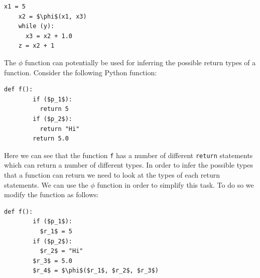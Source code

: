 \documentclass[12pt, titlepage]{article}
\begin{document}
\begin{lstlisting}[mathescape]
    x1 = 5
    x2 = $\phi$(x1, x3)
    while (y):
      x3 = x2 + 1.0
    z = x2 + 1
\end{lstlisting}
The $\phi$ function can potentially be used for inferring the possible return types of a function. Consider the following Python function:
\begin{lstlisting}[mathescape]
    def f():
        if ($p_1$):
          return 5
        if ($p_2$):
          return "Hi"
        return 5.0
\end{lstlisting}
Here we can see that the function \texttt{f} has a number of different \texttt{return} statements which can return a number of different types. In order to infer the possible types that a function can return we need to look at the types of each return statements. We can use the $\phi$ function in order to simplify this task. To do so we modify the function as follows:
\begin{lstlisting}[mathescape]
    def f():
        if ($p_1$):
          $r_1$ = 5
        if ($p_2$):
          $r_2$ = "Hi"
        $r_3$ = 5.0
        $r_4$ = $\phi$($r_1$, $r_2$, $r_3$)
\end{lstlisting}
\end{document}
